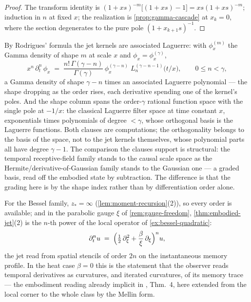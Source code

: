 \begin{proof}
The transform identity is $(1+xs)^{-m}\bigl[(1+xs) - 1\bigr] = xs(1+xs)^{-m}$; induction in
$n$ at fixed $x$; the realization is \ref{prop:gamma-cascade} at $x_k = 0$,
where the section degenerates to the pure pole $(1 + x_{k+1}s)^{-1}$.
\end{proof}

\begin{remark}\label{rem:laguerre}
By Rodrigues' formula the jet kernels are associated Laguerre: with $\phi^{(m)}_x$ the
Gamma density of shape $m$ at scale $x$ and $\phi_x = \phi^{(\gamma)}_x$,
\[
  x^n\,\partial_t^n\, \phi_x \;=\; \frac{n!\,\Gamma(\gamma - n)}{\Gamma(\gamma)}\,
  \phi^{(\gamma - n)}_x\; L_n^{(\gamma - n - 1)}\bigl(t/x\bigr),
  \qquad 0 \le n < \gamma,
\]
a Gamma density of shape $\gamma - n$ times an associated Laguerre polynomial --- the
shape dropping as the order rises, each derivative spending one of the kernel's poles.
And the shape column spans the order-$\gamma$ rational function space with the single
pole at $-1/x$: the classical Laguerre filter space at time constant $x$, exponentials
times polynomials of degree $< \gamma$, whose orthogonal basis is the Laguerre
functions. Both clauses are computations; the orthogonality belongs to the basis of the
space, not to the jet kernels themselves, whose polynomial parts all have degree
$\gamma - 1$. The comparison the clauses support is structural: the temporal
receptive-field family stands to the causal scale space
as the Hermite/derivative-of-Gaussian family stands to the Gaussian one --- a graded basis,
read off the embodied state by subtraction. The difference is that the grading here is
by the shape index rather than by differentiation order alone.
\end{remark}

\begin{remark}\label{rem:local-jet}
For the Bessel family, $z_* = \infty$ (\ref{lem:moment-recursion}(2)), so every order
is available; and in the parabolic gauge $\xi$ of \ref{rem:gauge-freedom},
\ref{thm:embodied-jet}(2) is the $n$-th power of the local operator of
\ref{ex:bessel-quadratic}:
\[
  \partial_t^n u \;=\; \Bigl(\tfrac12\,\partial_\xi^2 + \frac{\beta}{\xi}\,\partial_\xi\Bigr)^{n} u,
\]
the jet read from spatial stencils of order $2n$ on the instantaneous memory profile. In the
heat case $\beta = 0$ this is the statement that the observer reads temporal derivatives as
curvatures, and iterated curvatures, of its memory trace --- the embodiment reading already
implicit in , Thm.~4, here extended from the local corner to
the whole class by the Mellin form.
\end{remark}
